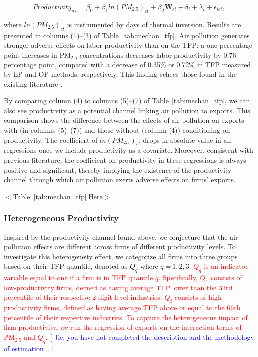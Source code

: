 \documentclass[12pt]{article}
\begin{document}
\begin{equation} \label{equ3}
Productivity_{ict}=\beta _{0}+\beta _{1}ln(PM_{2.5})_{ct}+\beta _{2}\mathbf{W}%
_{ct}+\delta _{i}+\lambda _{t}+\epsilon _{ict},
\end{equation}

where $ln(PM_{2.5})_{ct}$ is instrumented by days of thermal inversion. Results
are presented in columns (1)--(3) of Table~\ref{tab:mechan_tfp}. Air
pollution generates stronger adverse effects on labor productivity than on
the TFP: a one percentage point increases in $\mathrm{PM_{2.5}}$
concentrations decreases labor productivity by 0.76 percentage point,
compared with a decrease of 0.35\% or 0.72\% in TFP measured by LP and OP
methods, respectively. This finding echoes those found in the existing
literature %
\citep{fu2021air,somanathan2021impact,chang2016particulate,adhvaryu2022management}%
.

By comparing column (4) to columns (5)--(7) of Table~\ref{tab:mechan_tfp},
we can also see productivity as a potential channel linking air pollution to
exports. This comparison shows the difference between the effects of air
pollution on exports with (in columns (5)--(7)) and those without (column
(4)) conditioning on productivity. The coefficient of $ln(PM_{2.5})_{ct}$ drops
in absolute value in all regressions once we include productivity as a
covariate. Moreover, consistent with previous literature, the coefficient on productivity in these regressions is always positive and significant, thereby implying the existence of the productivity channel
through which air pollution exerts adverse effects on firms' exports. 

\begin{center}
$<$Table~\ref{tab:mechan_tfp} Here$>$
\end{center}

\subsubsection{Heterogeneous Productivity}

Inspired by the productivity channel found above, we conjecture that the air pollution effects are different across firms of different
productivity levels. To investigate this heterogeneity effect, we categorize all firms into three groups based on their TFP quantile, denoted as $Q_{q}$ where $q = 1, 2, 3$. \textcolor{red}{$Q_{q}$ is an indicator variable equal to one if a firm is in TFP quantile $q$. Specifically, $Q_{1}$ consists of low-productivity firms, defined as having average TFP lower than the 33rd percentile of their respective 2-digit-level industries.  $Q_{3}$ consists of high-productivity firms, defined as having average TFP above or equal to the 66th percentile of their respective industries.} \textcolor{red}{To capture the heterogeneous impact of firm productivity, we run the regression of exports on the interaction terms of $\mathrm{PM_{2.5}}$ and $Q_{q}$.} [\textcolor{blue}{ Jie: you have not completed the description and the methodology of estimation ...}] 
\end{document}
